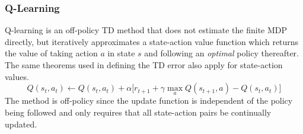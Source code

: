 \subsubsection{Q-Learning}
\label{sec:qlearning}
%
Q-learning is an off-policy TD method that does not estimate the finite
MDP directly, but iteratively approximates a state-action value
function which returns the value of taking action $a$ in state $s$ and
following an \textit{optimal} policy thereafter. The same theorems used in defining the TD error also apply for
state-action values.
\begin{equation}
\label{eq:qlearning}
Q(s_t,a_t) \leftarrow Q(s_t,a_t) + \alpha \bigl[r_{t+1} + \gamma\max_a
Q(s_{t+1},a)-Q(s_t,a_t) \bigr]
\end{equation}
The method is off-policy since the update function is independent of the policy
being followed and only requires that all state-action pairs be continually
updated.


